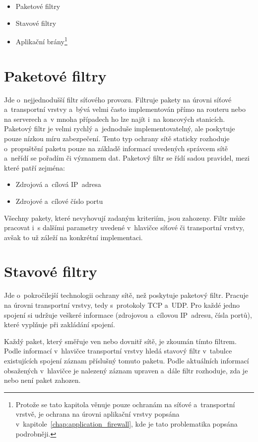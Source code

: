 \begin{itemize}
	\item Paketové filtry
	\item Stavové filtry
	\item Aplikační brány\footnote{Protože se tato kapitola věnuje pouze ochranám na síťové a~transportní vrstvě, je ochrana na úrovni aplikační vrstvy popsána v~kapitole~\ref{chap:application_firewall}, kde je tato problematika popsána podrobněji.}
\end{itemize}

\section{Paketové filtry}
Jde o~nejjednodušší filtr síťového provozu. Filtruje pakety na úrovni síťové a~transportní vrstvy a~bývá velmi často implementován přímo na routeru nebo na serverech a~v mnoha případech ho lze najít i~na koncových stanicích. Paketový filtr je velmi rychlý a~jednoduše implementovatelný, ale poskytuje pouze nízkou míru zabezpečení. Tento typ ochrany sítě staticky rozhoduje o~propuštění paketu pouze na základě informací uvedených správcem sítě a~neřídí se pořadím či významem dat. Paketový filtr se řídí sadou pravidel, mezi které patří zejména:
\begin{itemize}
	\item Zdrojová a~cílová IP~adresa
	\item Zdrojové a~cílové číslo portu
\end{itemize}
Všechny pakety, které nevyhovují zadaným kriteriím, jsou zahozeny. Filtr může pracovat i~s dalšími parametry uvedené v~hlavičce síťové či transportní vrstvy, avšak to už záleží na konkrétní implementaci.

\section{Stavové filtry}
Jde o~pokročilejší technologii ochrany sítě, než poskytuje paketový filtr. Pracuje na úrovni transportní vrstvy, tedy s~protokoly TCP a~UDP. Pro každé jedno spojení si udržuje veškeré informace (zdrojovou a~cílovou IP~adresu, čísla portů), které vyplňuje při zakládání spojení.

Každý paket, který směřuje ven nebo dovnitř sítě, je zkoumán tímto filtrem. Podle informací v~hlavičce transportní vrstvy hledá stavový filtr v~tabulce existujících spojení záznam příslušný tomuto paketu. Podle aktuálních informací obsažených v~hlavičce je nalezený záznam upraven a~dále filtr rozhoduje, zda je nebo není paket zahozen.

